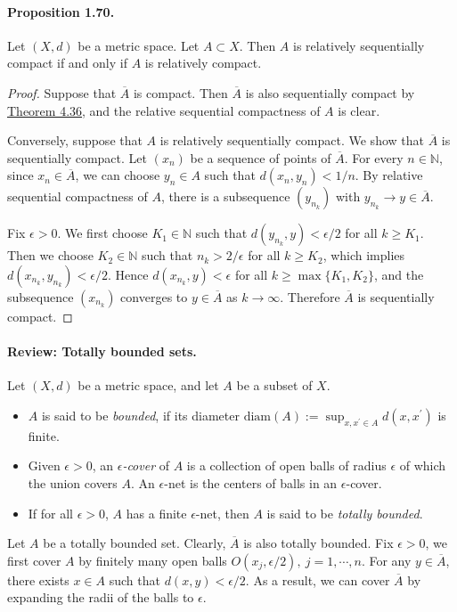 \documentclass{article}
\begin{document}
\paragraph{Proposition 1.70.\label{prop:1.70}} Let $(X,d)$ be a metric space. Let $A\subset X$. Then $A$ is relatively sequentially compact if and only if $A$ is relatively compact.
\begin{proof}
	Suppose that $\overline{A}$ is compact. Then $\overline{A}$ is also sequentially compact by \hyperref[thm:4.36]{Theorem 4.36}, and the relative sequential compactness of $A$ is clear.
	
	Conversely, suppose that $A$ is relatively sequentially compact. We show that $\overline{A}$ is sequentially compact. Let $(x_n)$ be a sequence of points of $\overline{A}$. For every $n\in\mathbb{N}$, since $x_n\in\overline{A}$, we can choose $y_n\in A$ such that $d(x_n,y_n)<1/n$. By relative sequential compactness of $A$, there is a subsequence $(y_{n_k})$ with $y_{n_k}\to y\in\overline{A}$. 
	
	Fix $\epsilon > 0$. We first choose $K_1\in\mathbb{N}$ such that $d(y_{n_k},y)<\epsilon/2$ for all $k\geq K_1$. Then we choose $K_2\in\mathbb{N}$ such that $n_k > 2/\epsilon$ for all $k\geq K_2$, which implies $d(x_{n_k},y_{n_k})<\epsilon/2$. Hence $d(x_{n_k},y) < \epsilon$ for all $k\geq\max\{K_1,K_2\}$, and the subsequence $(x_{n_k})$ converges to $y\in\overline{A}$ as $k\to\infty$. Therefore $\overline{A}$ is sequentially compact.
\end{proof}

\paragraph{Review: Totally bounded sets.} Let $(X,d)$ be a metric space, and let $A$ be a subset of $X$.
\begin{itemize}
	\item $A$ is said to be \textit{bounded}, if its diameter $\mathrm{diam}(A):=\sup_{x,x^\prime\in A}d(x,x^\prime)$ is finite. 
	\item Given $\epsilon > 0$, an $\epsilon$\textit{-cover} of $A$ is a collection of open balls of radius $\epsilon$ of which the union covers $A$. An $\epsilon$-net is the centers of balls in an $\epsilon$-cover.
	\item If for all $\epsilon>0$, $A$ has a finite $\epsilon$-net, then $A$ is said to be \textit{totally bounded}.
\end{itemize}
Let $A$ be a totally bounded set. Clearly, $\overline{A}$ is also totally bounded. Fix $\epsilon>0$, we first cover $A$ by finitely many open balls $O(x_j,\epsilon/2),\ j=1,\cdots,n$. For any $y\in\overline{A}$, there exists $x\in A$ such that $d(x,y)<\epsilon/2$. As a result, we can cover $\overline{A}$ by expanding the radii of the balls to $\epsilon$.
\end{document}
